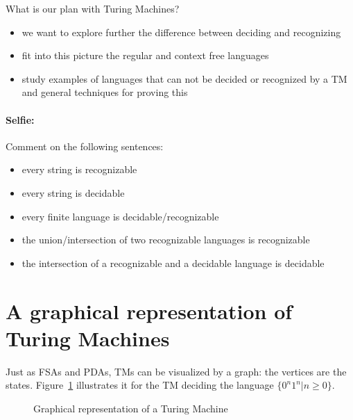 What is our plan with Turing Machines?

\begin{itemize}
\item we want to explore further the difference between deciding and
  recognizing
\item fit into this picture the regular and context free
  languages
\item study examples of languages that can not be decided or
  recognized by a TM and general techniques for proving this
\end{itemize}



\paragraph{Selfie:} Comment on the following sentences:

\begin{itemize}
\item every string is recognizable
\item every string is decidable
\item every finite language is decidable/recognizable
\item the union/intersection of two recognizable languages is recognizable
\item the intersection of a recognizable and a decidable language is
  decidable
\end{itemize}




\section{A graphical representation of Turing Machines}

Just as FSAs and PDAs, TMs can be visualized by a graph: the vertices
are the states. Figure~\ref{turing2} illustrates it for the TM
deciding the language $\{0^n1^n|n \geq 0\}$.




\begin{figure}[h]
\caption{Graphical representation of a Turing Machine\label{turing2}}
\end{figure}

